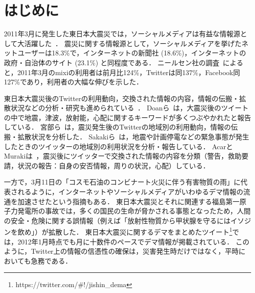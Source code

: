 \documentclass[japanese]{jnlp_1.4}
\begin{document}
\maketitle


\section{はじめに}

2011年3月に発生した東日本大震災では，ソーシャルメディアは有益な情報源として大活躍した~\cite{nomura201103}．
震災に関する情報源として，ソーシャルメディアを挙げたネットユーザーは18.3\%で，インターネットの新聞社 (18.6\%)，インターネットの政府・自治体のサイト (23.1\%) と同程度である．
ニールセン社の調査~\cite{netrating201103}によると，2011年3月のmixiの利用者は前月比124\%，Twitterは同137\%，Facebook同127\%であり，利用者の大幅な伸びを示した．

東日本大震災後のTwitterの利用動向，交換された情報の内容，情報の伝搬・拡散状況などの分析・研究も進められている~\cite{Acar:11,Doan:11,Sakaki:11,Miyabe:11}．
Doanら~\cite{Doan:11}は，大震災後のツイートの中で地震，津波，放射能，心配に関するキーワードが多くつぶやかれたと報告している．
宮部ら~\cite{Miyabe:11}は，震災発生後のTwitterの地域別の利用動向，情報の伝搬・拡散状況を分析した．
Sakakiら~\cite{Sakaki:11}は，地震や計画停電などの緊急事態が発生したときのツイッターの地域別の利用状況を分析・報告している．
AcarとMurakiは~\cite{Acar:11}，震災後にツイッターで交換された情報の内容を分類（警告，救助要請，状況の報告：自身の安否情報，周りの状況，心配）している．

一方で，3月11日の「コスモ石油のコンビナート火災に伴う有害物質の雨」に代表されるように，インターネットやソーシャルメディアがいわゆるデマ情報の流通を加速させたという指摘もある．
東日本大震災とそれに関連する福島第一原子力発電所の事故では，多くの国民の生命が脅かされる事態となったため，人間の安全・危険に関する誤情報（例えば「放射性物質から甲状腺を守るにはイソジンを飲め」）が拡散した．
東日本大震災に関するデマをまとめたツイート\footnote{https://twitter.com/\#!/jishin\_dema}では，2012年1月時点でも月に十数件のペースでデマ情報が掲載されている．
このように，Twitter上の情報の信憑性の確保は，災害発生時だけではなく，平時においても急務である．
\end{document}
